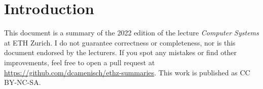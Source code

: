 \section{Introduction}

This document is a summary of the 2022 edition of the lecture \textit{Computer Systems} at ETH Zurich. I do not guarantee correctness or completeness, nor is this document endorsed by the lecturers. If you spot any mistakes or find other improvements, feel free to open a pull request at \url{https://github.com/dcamenisch/ethz-summaries}. This work is published as CC BY-NC-SA.

\begin{center}
	\ccbyncsa
\end{center}